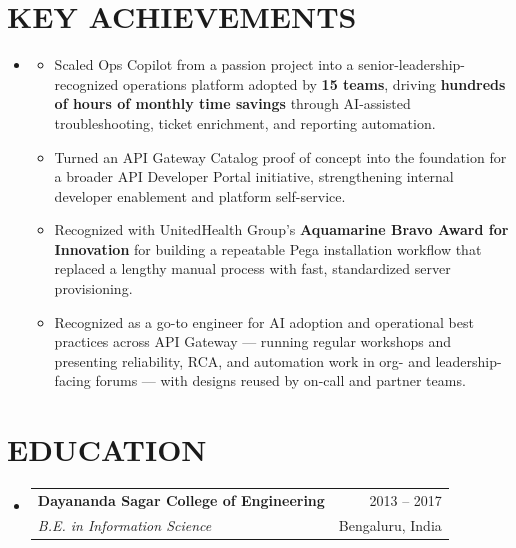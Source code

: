 \documentclass[letterpaper,11pt]{article}
\makeatletter
\newcommand{\resumeItem}[1]{
  \item\small{{#1 \vspace{-1pt}}}
}
\newcommand{\resumeSubheading}[4]{
  \vspace{-1pt}\item
    \begin{tabular*}{\textwidth}[t]{l@{\extracolsep{\fill}}r}
      \textbf{#1} & {\color{dark-grey}\small #2}\vspace{1pt}\\
      \textit{#3} & {\color{dark-grey}\small #4}\\
    \end{tabular*}\vspace{-4pt}
}
\newcommand{\resumeSubHeadingListStart}{\begin{itemize}[leftmargin=0in, label={}]}
\newcommand{\resumeSubHeadingListEnd}{\end{itemize}}
\newcommand{\resumeItemListStart}{\begin{itemize}[leftmargin=18pt]}
\newcommand{\resumeItemListEnd}{\end{itemize}\vspace{0pt}}
\makeatother
\begin{document}
\section{KEY ACHIEVEMENTS}
\resumeSubHeadingListStart
  \item[]
    \resumeItemListStart
      \resumeItem{Scaled Ops Copilot from a passion project into a senior-leadership-recognized operations platform adopted by \textbf{15 teams}, driving \textbf{hundreds of hours of monthly time savings} through AI-assisted troubleshooting, ticket enrichment, and reporting automation.}
      \resumeItem{Turned an API Gateway Catalog proof of concept into the foundation for a broader API Developer Portal initiative, strengthening internal developer enablement and platform self-service.}
      \resumeItem{Recognized with UnitedHealth Group's \textbf{Aquamarine Bravo Award for Innovation} for building a repeatable Pega installation workflow that replaced a lengthy manual process with fast, standardized server provisioning.}
      \resumeItem{Recognized as a go-to engineer for AI adoption and operational best practices across API Gateway --- running regular workshops and presenting reliability, RCA, and automation work in org- and leadership-facing forums --- with designs reused by on-call and partner teams.}
    \resumeItemListEnd
\resumeSubHeadingListEnd

\section{EDUCATION}
\resumeSubHeadingListStart
    \resumeSubheading
      {Dayananda Sagar College of Engineering}{2013 -- 2017}
      {B.E. in Information Science}{Bengaluru, India}
\resumeSubHeadingListEnd

\end{document}
